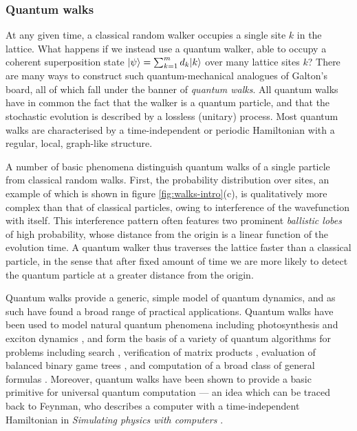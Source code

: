 \subsubsection{Quantum walks}
\label{sec:continuous-time-quantum-walks-of-photons}
At any given time, a classical random walker occupies a single site $k$ in the lattice. What happens if we instead use a quantum walker, able to occupy a coherent superposition state $\mbox{$ | \psi \rangle $} = \sum_{k=1}^m d_k \mbox{$ | k \rangle $}$ over many lattice sites $k$? There are many ways to construct such quantum-mechanical analogues of Galton's board, all of which fall under the banner of \emph{quantum walks}. All quantum walks have in common the fact that the walker is a quantum particle, and that the stochastic evolution is described by a lossless (unitary) process. Most quantum walks are characterised by a time-independent or periodic Hamiltonian with a regular, local, graph-like structure.

A number of basic phenomena distinguish quantum walks of a single particle from classical random walks. 
First,  the probability distribution over sites, an example of which is shown in figure \ref{fig:walks-intro}(c), is qualitatively more complex than that of classical particles, owing to interference of the wavefunction with itself. This interference pattern often features two prominent \emph{ballistic lobes} of high probability, whose distance from the origin is a linear function of the evolution time.  A quantum walker thus traverses the lattice faster than a classical particle, in the sense that after fixed amount of time we are more likely to detect the quantum particle at a greater distance from the origin. 

Quantum walks provide a generic, simple model of quantum dynamics, and as such have found a broad range of practical applications. Quantum walks have been used to model natural quantum phenomena including photosynthesis \cite{Mohseni2008i} and exciton dynamics \cite{Klafter1980}, and form the basis of a variety of quantum algorithms for problems including search \cite{Childs2004, Shenvi2003, Childs2003a}, verification of matrix products \cite{Buhrman2004}, evaluation of balanced binary game trees \cite{Farhi2007}, and computation of a broad class of general formulas \cite{Reichardt2007}. Moreover, quantum walks have been shown to provide a basic primitive for universal quantum computation \cite{Childs2009, Childs2013a} --- an idea which can be traced back to Feynman, who describes a computer with a time-independent Hamiltonian in \emph{Simulating physics with computers} \cite{Feynman1982d}.

